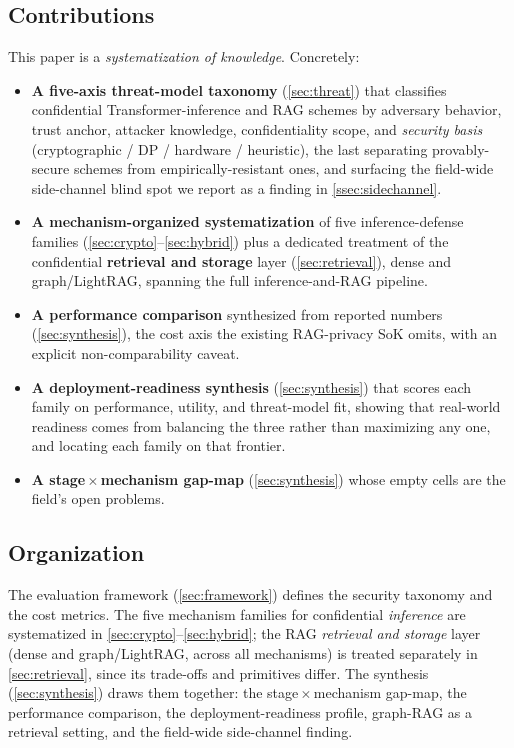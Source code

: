 \subsection{Contributions}
This paper is a \emph{systematization of knowledge}. Concretely:
\begin{itemize}
  \item \textbf{A five-axis threat-model taxonomy} (\cref{sec:threat}) that
        classifies confidential Transformer-inference and RAG schemes by
        adversary behavior, trust anchor, attacker knowledge, confidentiality
        scope, and \emph{security basis} (cryptographic / DP / hardware /
        heuristic), the last separating provably-secure schemes from
        empirically-resistant ones, and surfacing the field-wide side-channel blind
        spot we report as a finding in \cref{ssec:sidechannel}.
  \item \textbf{A mechanism-organized systematization} of five inference-defense
        families (\cref{sec:crypto}--\cref{sec:hybrid}) plus a dedicated treatment of the
        confidential \textbf{retrieval and storage} layer (\cref{sec:retrieval}), dense and
        graph/LightRAG, spanning the full inference-and-RAG pipeline.
  \item \textbf{A performance comparison} synthesized from reported numbers
        (\cref{sec:synthesis}), the cost axis the existing RAG-privacy SoK
        \citep{bodea_sok} omits, with an explicit non-comparability caveat.
  \item \textbf{A deployment-readiness synthesis} (\cref{sec:synthesis}) that scores
        each family on performance, utility, and threat-model fit, showing that
        real-world readiness comes from balancing the three rather than maximizing any
        one, and locating each family on that frontier.
  \item \textbf{A stage\,$\times$\,mechanism gap-map} (\cref{sec:synthesis})
        whose empty cells are the field's open problems.
\end{itemize}

\subsection{Organization}
The evaluation framework (\cref{sec:framework}) defines the security taxonomy and the cost
metrics. The five mechanism families for confidential \emph{inference} are systematized in
\cref{sec:crypto}--\cref{sec:hybrid}; the RAG \emph{retrieval and storage} layer (dense and
graph/LightRAG, across all mechanisms) is treated separately in \cref{sec:retrieval}, since
its trade-offs and primitives differ. The synthesis (\cref{sec:synthesis}) draws them
together: the stage\,$\times$\,mechanism gap-map, the performance comparison, the
deployment-readiness profile, graph-RAG as a retrieval setting, and the field-wide
side-channel finding.
